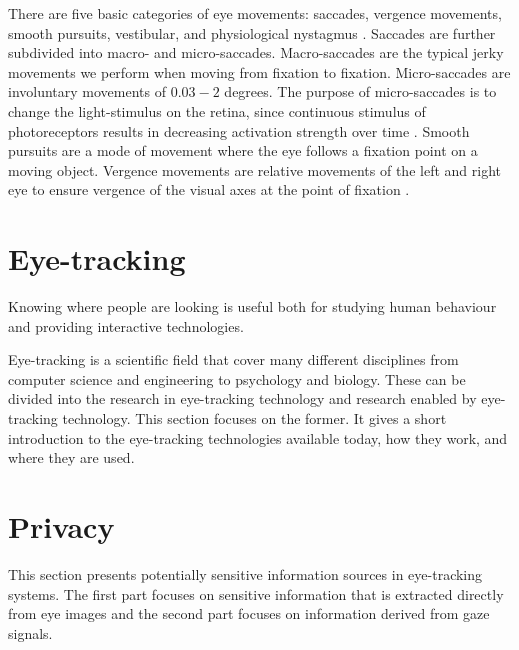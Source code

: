 There are five basic categories of eye movements: saccades, vergence movements, smooth pursuits, vestibular, and physiological nystagmus \parencite[39]{methodology}. Saccades are further subdivided into macro- and micro-saccades. Macro-saccades are the typical jerky movements we perform when moving from fixation to fixation. Micro-saccades are involuntary movements of $0.03-2$ degrees. The purpose of micro-saccades is to change the light-stimulus on the retina, since continuous stimulus of photoreceptors results in decreasing activation strength over time \parencite[44]{methodology}. Smooth pursuits are a mode of movement where the eye follows a fixation point on a moving object. Vergence movements are relative movements of the left and right eye to ensure vergence of the visual axes at the point of fixation \parencite{methodology}.


\section{Eye-tracking}
Knowing where people are looking is useful both for studying human behaviour and providing interactive technologies. 

Eye-tracking is a scientific field that cover many different disciplines from computer science and engineering to psychology and biology. These can be divided into the research in eye-tracking technology and research enabled by eye-tracking technology. This section focuses on the former. It gives a short introduction to the eye-tracking technologies available today, how they work, and where they are used.


\section{Privacy}
This section presents potentially sensitive information sources in eye-tracking systems. The first part focuses on sensitive information that is extracted directly from eye images and the second part focuses on information derived from gaze signals.
